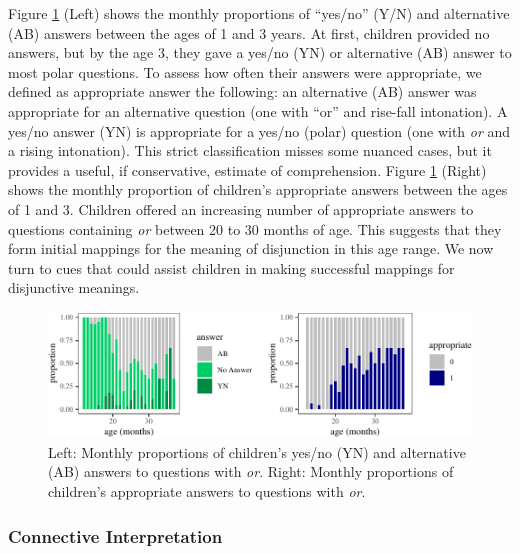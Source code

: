 \documentclass[
  english,
  ,man,floatsintext]{apa6}
\begin{document}
Figure \ref{fig:answerPlot} (Left) shows the monthly proportions of ``yes/no'' (Y/N) and alternative (AB) answers between the ages of 1 and 3 years. At first, children provided no answers, but by the age 3, they gave a yes/no (YN) or alternative (AB) answer to most polar questions. To assess how often their answers were appropriate, we defined as appropriate answer the following: an alternative (AB) answer was appropriate for an alternative question (one with ``or'' and rise-fall intonation). A yes/no answer (YN) is appropriate for a yes/no (polar) question (one with \emph{or} and a rising intonation). This strict classification misses some nuanced cases, but it provides a useful, if conservative, estimate of comprehension. Figure \ref{fig:answerPlot} (Right) shows the monthly proportion of children's appropriate answers between the ages of 1 and 3. Children offered an increasing number of appropriate answers to questions containing \emph{or} between 20 to 30 months of age. This suggests that they form initial mappings for the meaning of disjunction in this age range. We now turn to cues that could assist children in making successful mappings for disjunctive meanings.

\begin{figure}[H]

{\centering \includegraphics{figs/answerPlot-1} 

}

\caption{Left: Monthly proportions of children's yes/no (YN) and alternative (AB) answers to questions with \textit{or}. Right: Monthly proportions of children's appropriate answers to questions with \textit{or}.}\label{fig:answerPlot}
\end{figure}

\hypertarget{connective-interpretation}{%
\subsubsection{Connective Interpretation}\label{connective-interpretation}}
\end{document}
